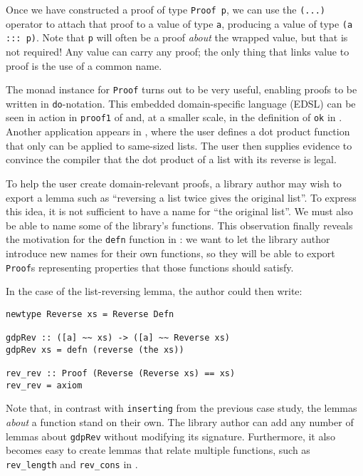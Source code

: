 \documentclass[format=sigplan, review=false, screen=true]{acmart}
\makeatletter
\let\origsubsection\subsection
\renewcommand\subsection{\@ifstar{\starsubsection}{\nostarsubsection}}
\newcommand\nostarsubsection[1]
{\subsectionprelude\origsubsection{#1}\subsectionpostlude}
\newcommand\starsubsection[1]
{\subsectionprelude\origsubsection*{#1}\subsectionpostlude}
\newcommand\subsectionprelude{%
  \vspace{-0.25em}
}
\newcommand\subsectionpostlude{%
  \vspace{-0.05em}
}
\makeatother
\begin{document}
Once we have constructed a proof of type \texttt{Proof p}, we can use the \texttt{(...)} operator to attach that proof to a value of type \texttt{a}, producing a value of type \verb|(a ::: p)|. Note that \texttt{p} will often be a proof \emph{about} the wrapped value,
but that is not required! Any value can carry any proof; the only thing that links value to proof is the use of a common name.


The monad instance for \texttt{Proof} turns out to be very useful, enabling proofs to be written in
\texttt{do}-notation. This embedded domain-specific language (EDSL) can be seen in action
in \texttt{proof1} of  and, at a smaller scale, in the
definition of \texttt{ok} in . Another application appears in , where the user defines a dot product function that only can be applied to same-sized lists.
The user then supplies evidence to convince the compiler that the dot product of a list with its reverse is legal.

\subsection{Naming library functions}
To help the user create domain-relevant proofs, a library author may wish to export a lemma such
as ``reversing a list twice gives the original list''.
To express this idea, it is not sufficient to have a name for ``the original list''. We must also be able to
name some of the library's functions. This observation finally reveals the motivation for  the \texttt{defn}
function in : we want to let the library author introduce new names for their own functions,
so they will be able to export \texttt{Proof}s representing properties that those functions should satisfy.

In the case of the list-reversing lemma, the author could then write:
\begin{verbatim}
newtype Reverse xs = Reverse Defn

gdpRev :: ([a] ~~ xs) -> ([a] ~~ Reverse xs)
gdpRev xs = defn (reverse (the xs))

rev_rev :: Proof (Reverse (Reverse xs) == xs)
rev_rev = axiom
\end{verbatim}
Note that, in contrast with \texttt{inserting} from the previous case study,
the lemmas \emph{about} a function stand on their own.
The library author can add any number of lemmas about \texttt{gdpRev}
without modifying its signature. Furthermore, it also becomes easy to
create lemmas that relate multiple functions, such as \verb|rev_length|
and \verb|rev_cons| in .
\end{document}
